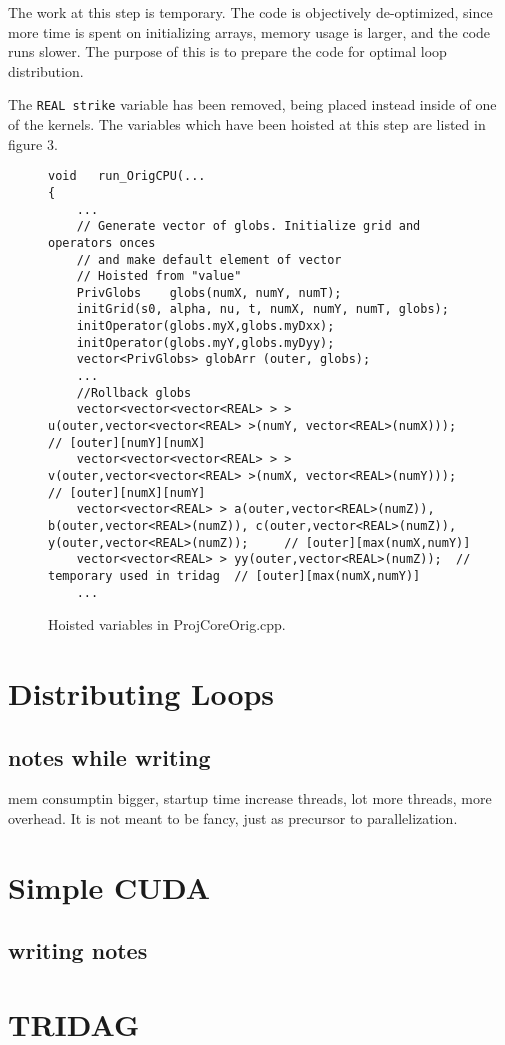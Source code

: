 \documentclass[]{report}
\begin{document}
The work at this step is temporary. The code is objectively de-optimized, since more time is spent on initializing arrays, memory usage is larger, and the code runs slower. The purpose of this is to prepare the code for optimal loop distribution.

The \texttt{REAL strike} variable has been removed, being placed instead inside of one of the kernels. The variables which have been hoisted at this step are listed in figure 3.
\begin{figure}[h]
\begin{lstlisting}
void   run_OrigCPU(...
{   
	...
	// Generate vector of globs. Initialize grid and operators onces
    // and make default element of vector
    // Hoisted from "value"
    PrivGlobs    globs(numX, numY, numT);
    initGrid(s0, alpha, nu, t, numX, numY, numT, globs);
    initOperator(globs.myX,globs.myDxx);
    initOperator(globs.myY,globs.myDyy);
    vector<PrivGlobs> globArr (outer, globs);
    ...
    //Rollback globs
    vector<vector<vector<REAL> > > u(outer,vector<vector<REAL> >(numY, vector<REAL>(numX)));   // [outer][numY][numX]
    vector<vector<vector<REAL> > > v(outer,vector<vector<REAL> >(numX, vector<REAL>(numY)));   // [outer][numX][numY]
    vector<vector<REAL> > a(outer,vector<REAL>(numZ)), b(outer,vector<REAL>(numZ)), c(outer,vector<REAL>(numZ)), y(outer,vector<REAL>(numZ));     // [outer][max(numX,numY)]
    vector<vector<REAL> > yy(outer,vector<REAL>(numZ));  // temporary used in tridag  // [outer][max(numX,numY)]
    ...
\end{lstlisting}
\caption{ Hoisted variables in ProjCoreOrig.cpp. }
\end{figure}
\section{Distributing Loops}
\subsection{notes while writing}
mem consumptin bigger, startup time increase threads, lot more threads, more overhead. It is not meant to be fancy, just as precursor to parallelization.
\section{Simple CUDA}
\subsection{writing notes}

\section{TRIDAG}
\end{document}
